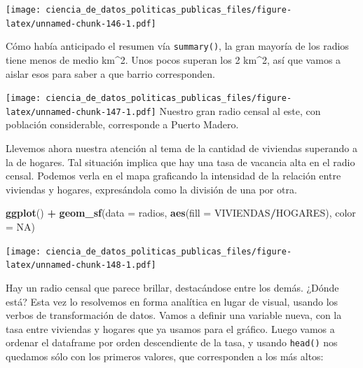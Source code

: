 \documentclass[]{book}
\newenvironment{Shaded}{\begin{snugshade}}{\end{snugshade}}
\newcommand{\KeywordTok}[1]{\textcolor[rgb]{0.13,0.29,0.53}{\textbf{#1}}}
\newcommand{\DataTypeTok}[1]{\textcolor[rgb]{0.13,0.29,0.53}{#1}}
\newcommand{\DecValTok}[1]{\textcolor[rgb]{0.00,0.00,0.81}{#1}}
\newcommand{\StringTok}[1]{\textcolor[rgb]{0.31,0.60,0.02}{#1}}
\newcommand{\OtherTok}[1]{\textcolor[rgb]{0.56,0.35,0.01}{#1}}
\newcommand{\OperatorTok}[1]{\textcolor[rgb]{0.81,0.36,0.00}{\textbf{#1}}}
\newcommand{\NormalTok}[1]{#1}
\begin{document}
\texttt{[image: ciencia\_de\_datos\_politicas\_publicas\_files/figure-latex/unnamed-chunk-146-1.pdf]}

Cómo había anticipado el resumen vía \texttt{summary()}, la gran mayoría
de los radios tiene menos de medio km\^{}2. Unos pocos superan los 2
km\^{}2, así que vamos a aislar esos para saber a que barrio
corresponden.

\begin{Shaded}
\end{Shaded}

\texttt{[image: ciencia\_de\_datos\_politicas\_publicas\_files/figure-latex/unnamed-chunk-147-1.pdf]}
Nuestro gran radio censal al este, con población considerable,
corresponde a Puerto Madero.

Llevemos ahora nuestra atención al tema de la cantidad de viviendas
superando a la de hogares. Tal situación implica que hay una tasa de
vacancia alta en el radio censal. Podemos verla en el mapa graficando la
intensidad de la relación entre viviendas y hogares, expresándola como
la división de una por otra.

\begin{Shaded}
\begin{Highlighting}[]
\KeywordTok{ggplot}\NormalTok{() }\OperatorTok{+}\StringTok{ }\KeywordTok{geom_sf}\NormalTok{(}\DataTypeTok{data =}\NormalTok{ radios, }\KeywordTok{aes}\NormalTok{(}\DataTypeTok{fill =}\NormalTok{ VIVIENDAS}\OperatorTok{/}\NormalTok{HOGARES), }\DataTypeTok{color =} \OtherTok{NA}\NormalTok{)}
\end{Highlighting}
\end{Shaded}

\texttt{[image: ciencia\_de\_datos\_politicas\_publicas\_files/figure-latex/unnamed-chunk-148-1.pdf]}

Hay un radio censal que parece brillar, destacándose entre los demás.
¿Dónde está? Esta vez lo resolvemos en forma analítica en lugar de
visual, usando los verbos de transformación de datos. Vamos a definir
una variable nueva, con la tasa entre viviendas y hogares que ya usamos
para el gráfico. Luego vamos a ordenar el dataframe por orden
descendiente de la tasa, y usando \texttt{head()} nos quedamos sólo con
los primeros valores, que corresponden a los más altos:
\end{document}
